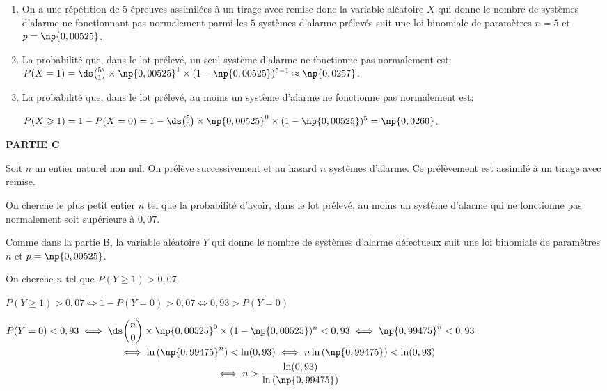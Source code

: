 \begin{enumerate}
\item On a une répétition de 5 épreuves  assimilées à un tirage avec remise donc  la variable aléatoire $X$ qui donne le nombre de systèmes d'alarme ne fonctionnant pas normalement parmi les $5$ systèmes d'alarme prélevés suit une loi binomiale de paramètres $n=5$ et $p=\np{0,00525}$.



\item La probabilité que, dans le lot prélevé, un seul système d'alarme ne fonctionne pas normalement est:
$P(X=1) = \ds\binom{5}{1} \times \np{0,00525}^1 \times (1-\np{0,00525})^{5-1}
\approx \np{0,0257}$.

\item La probabilité que, dans le lot prélevé, au moins un système d'alarme ne fonctionne pas normalement est:

$P(X\geqslant 1) = 1-P(X=0) = 1- \ds\binom{5}{0} \times \np{0,00525}^0 \times (1-\np{0,00525})^5 = \np{0,0260}$.

\end{enumerate}

\medskip

\textbf{PARTIE C}

\medskip

Soit $n$ un entier naturel non nul. On prélève successivement et au hasard $n$ systèmes d'alarme. Ce prélèvement est assimilé à un tirage avec remise.

On cherche le plus petit entier $n$ tel que la probabilité d'avoir, dans le lot prélevé, au moins un système d'alarme qui ne fonctionne pas normalement soit supérieure à $0,07$.

Comme dans la partie B, la variable aléatoire $Y$ qui donne le nombre de systèmes d'alarme défectueux suit une loi binomiale de paramètres $n$ et $p= \np{0,00525}$.

On cherche $n$ tel que $P(Y\geqslant 1) >0,07$.

$P(Y\geqslant 1) >0,07 \iff 1-P(Y=0)>0,07 \iff 0,93 > P(Y=0)$

$\begin{gathered}P(Y=0)<0,93 
\iff \ds\binom{n}{0}\times \np{0,00525}^0 \times (1-\np{0,00525})^n <0,93
\iff \np{0,99475}^n < 0,93\\
\phantom{P(Y=0)<0,93}
\iff \ln \left (\np{0,99475}^n\right ) < \ln(0,93)
\iff n \ln \left (\np{0,99475}\right )  < \ln(0,93)\\
\phantom{P(Y=0)<0,93}
\iff n> \dfrac{\ln(0,93)}{\ln \left (\np{0,99475}\right )}\end{gathered}$


